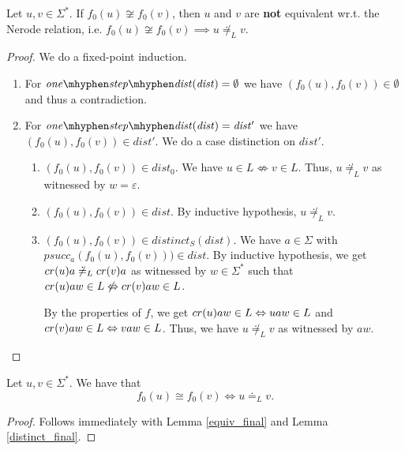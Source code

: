 \begin{lemma}
    \label{distinct_final}
    Let $u,v \in \Sigma^*$. 
    If ${f_0}(u) \not\cong {f_0}(v)$, then $u$ and $v$ are \textbf{not} equivalent wr.t. the Nerode relation, i.e. ${f_0}(u) \not\cong {f_0}(v) \implies u \not\doteq_L v$.
\end{lemma}
\begin{proof}
    We do a fixed-point induction.
    \begin{enumerate}
        \item For $\mathit{one\mhyphen step\mhyphen dist}(\mathit{dist}) = \emptyset$ we have $({f_0}(u), {f_0}(v)) \in \emptyset$ and thus a contradiction. 
        \item For $\mathit{one\mhyphen step\mhyphen dist}(\mathit{dist}) = \mathit{dist'}$ we have $({f_0}(u), {f_0}(v)) \in \mathit{dist'}$. 
            We do a case distinction on $\mathit{dist'}$.
            \begin{enumerate}
                \item $({f_0}(u), {f_0}(v)) \in \mathit{dist_0}$.
                    We have $u \in L \not\Leftrightarrow v \in L$. 
                    Thus, $u \not\doteq_L v$ as witnessed by $w=\varepsilon$.
                \item $({f_0}(u), {f_0}(v)) \in \mathit{dist}$. 
                    By inductive hypothesis, $u \not\doteq_L v$.
                \item $({f_0}(u), {f_0}(v)) \in \mathit{distinct_S}(\mathit{dist})$.
                    We have $a \in \Sigma$ with $\mathit{psucc_a}({f_0}(u), {f_0}(v))) \in \mathit{dist}$.
                    By inductive hypothesis, we get $cr(u)a \not\doteq_L cr(v)a$ 
                    as witnessed by $w \in \Sigma^*$ 
                    such that $cr(u)aw \in L \not\Leftrightarrow cr(v)aw \in L$.

                    By the properties of $f$, we get $cr(u)aw \in L \Leftrightarrow uaw \in L$ and $cr(v)aw \in L \Leftrightarrow vaw \in L$.
                    Thus, we have $u \not\doteq_L v$ as witnessed by $aw$.
            \end{enumerate}
    \end{enumerate}
\end{proof}


\begin{corollary}
    \label{equivP}
    Let $u, v \in \Sigma^*$. We have that
    \begin{equation*}
        {f_0}(u) \cong {f_0}(v) \iff u \doteq_L v.
    \end{equation*}
\end{corollary}
\begin{proof}
    Follows immediately with Lemma \ref{equiv_final} and Lemma \ref{distinct_final}. 
\end{proof}


